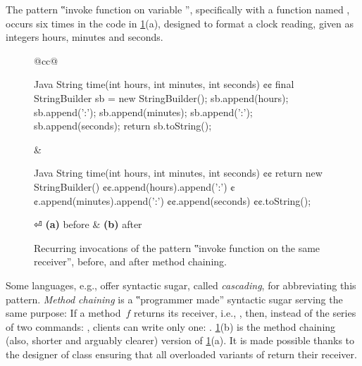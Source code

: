 The pattern ‟invoke function on variable ”, specifically with
  a function named , occurs six times in the code in \cref{Figure:chaining}(a), designed
  to format a clock reading, given as integers hours, minutes and
  seconds.

\begin{figure}[H]
  \caption{\label{Figure:chaining}%
    Recurring invocations of the pattern ‟invoke function on the same
      receiver”, before, and after method chaining.
  }%
    \begin{tabular}{@{}cc@{}}%
  \begin{lcode}[minipage,width=44ex,box align=center]{Java}
String time(int hours, int minutes, int seconds) {¢¢
  final StringBuilder sb = new StringBuilder();
  sb.append(hours);
  sb.append(':');
  sb.append(minutes);
  sb.append(':');
  sb.append(seconds);
  return sb.toString();
}\end{lcode}
\hfill
&
\hspace{1ex}
  \begin{lcode}[minipage,width=44ex,box align=center]{Java}
String time(int hours, int minutes, int seconds) {¢¢
    return new StringBuilder()
      ¢¢.append(hours).append(':')
      ¢¢.append(minutes).append(':')
      ¢¢.append(seconds)
      ¢¢.toString();
}\end{lcode}
⏎
\textbf{(a)} before & \textbf{(b)} after
\end{tabular}
\end{figure}

Some languages, e.g., \Smalltalk offer syntactic sugar, called \emph{cascading},
  for abbreviating this pattern.
\emph{Method chaining} is a ‟programmer made” syntactic sugar serving the same purpose:
  If a method~$f$ returns its receiver, i.e., ,
  then, instead of the series of two commands: \mbox{}, clients can write
  only one: \mbox{}.
  \cref{Figure:chaining}(b) is the method chaining
  (also, shorter and arguably clearer) version of
  \cref{Figure:chaining}(a).
It is made possible thanks to the designer of class  ensuring that 
  all overloaded variants of
   return their receiver.

